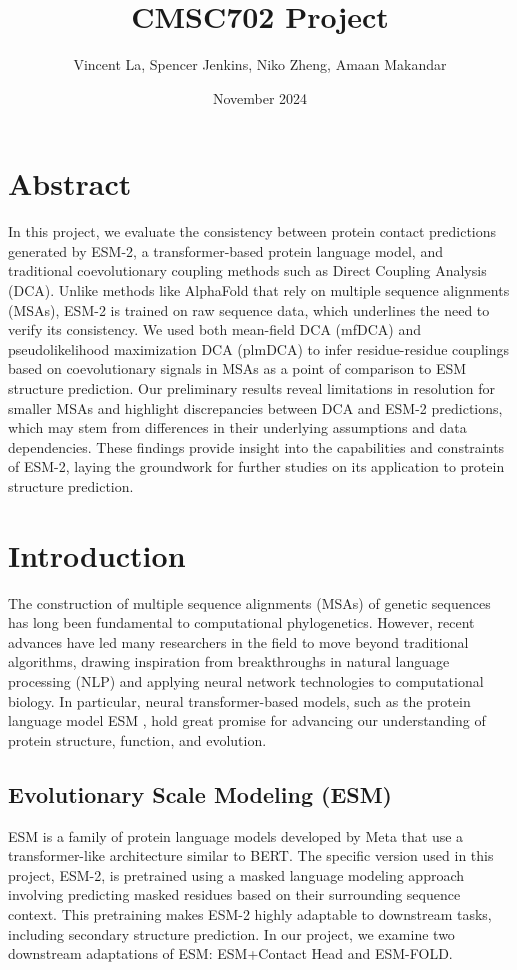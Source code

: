 \documentclass{article}
\title{CMSC702 Project}
\author{Vincent La, Spencer Jenkins, Niko Zheng, Amaan Makandar}
\date{November 2024}
\begin{document}
\maketitle

\section{Abstract}

In this project, we evaluate the consistency between protein contact predictions generated by ESM-2, a transformer-based protein language model, and traditional coevolutionary coupling methods such as Direct Coupling Analysis (DCA). Unlike methods like AlphaFold that rely on multiple sequence alignments (MSAs), ESM-2 is trained on raw sequence data, which underlines the need to verify its consistency. We used both mean-field DCA (mfDCA) and pseudolikelihood maximization DCA (plmDCA) to infer residue-residue couplings based on coevolutionary signals in MSAs as a point of comparison to ESM structure prediction. Our preliminary results reveal limitations in resolution for smaller MSAs and highlight discrepancies between DCA and ESM-2 predictions, which may stem from differences in their underlying assumptions and data dependencies. These findings provide insight into the capabilities and constraints of ESM-2, laying the groundwork for further studies on its application to protein structure prediction.

\section{Introduction}

The construction of multiple sequence alignments (MSAs) of genetic sequences has long been fundamental to computational phylogenetics. However, recent advances have led many researchers in the field to move beyond traditional algorithms, drawing inspiration from breakthroughs in natural language processing (NLP) and applying neural network technologies to computational biology. In particular, neural transformer-based models, such as the protein language model ESM \cite{ESM-FOLD}, hold great promise for advancing our understanding of protein structure, function, and evolution.

\subsection{Evolutionary Scale Modeling (ESM)}
ESM is a family of protein language models developed by Meta that use a transformer-like architecture similar to BERT. The specific version used in this project, ESM-2, is pretrained using a masked language modeling approach involving predicting masked residues based on their surrounding sequence context. This pretraining makes ESM-2 highly adaptable to downstream tasks, including secondary structure prediction. In our project, we examine two downstream adaptations of ESM: ESM+Contact Head and ESM-FOLD.
\end{document}
